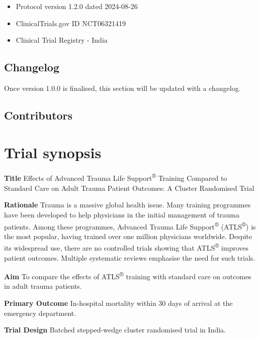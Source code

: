 \documentclass[
]{scrartcl}
\providecommand{\tightlist}{%
  \setlength{\itemsep}{0pt}\setlength{\parskip}{0pt}}\usepackage{longtable,booktabs,array}
\begin{document}
\begin{itemize}
\tightlist
\item
  Protocol version 1.2.0 dated 2024-08-26
\item
  ClinicalTrials.gov ID NCT06321419
\item
  Clinical Trial Registry - India
\end{itemize}

\hypertarget{changelog}{%
\subsection{Changelog}\label{changelog}}

Once version 1.0.0 is finalised, this section will be updated with a
changelog.

\hypertarget{contributors}{%
\subsection{Contributors}\label{contributors}}

\newpage{}

\hypertarget{trial-synopsis}{%
\section{Trial synopsis}\label{trial-synopsis}}

\textbf{Title} Effects of Advanced Trauma Life
Support\textsuperscript{®} Training Compared to Standard Care on Adult
Trauma Patient Outcomes: A Cluster Randomised Trial

\textbf{Rationale} Trauma is a massive global health issue. Many
training programmes have been developed to help physicians in the
initial management of trauma patients. Among these programmes, Advanced
Trauma Life Support\textsuperscript{®} (ATLS\textsuperscript{®}) is the
most popular, having trained over one million physicians worldwide.
Despite its widespread use, there are no controlled trials showing that
ATLS\textsuperscript{®} improves patient outcomes. Multiple systematic
reviews emphasise the need for such trials.

\textbf{Aim} To compare the effects of ATLS\textsuperscript{®} training
with standard care on outcomes in adult trauma patients.

\textbf{Primary Outcome} In-hospital mortality within 30 days of arrival
at the emergency department.

\textbf{Trial Design} Batched stepped-wedge cluster randomised trial in
India.
\end{document}
